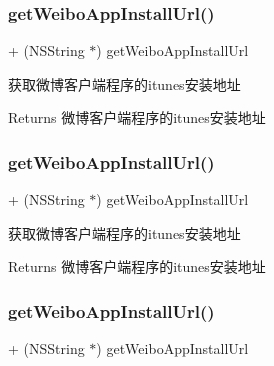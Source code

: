 \subsubsection{\texorpdfstring{get\+Weibo\+App\+Install\+Url()}{getWeiboAppInstallUrl()}\hspace{0.1cm}{\footnotesize\ttfamily [1/3]}}
{\footnotesize\ttfamily + (N\+S\+String $\ast$) get\+Weibo\+App\+Install\+Url \begin{DoxyParamCaption}{ }\end{DoxyParamCaption}}

获取微博客户端程序的itunes安装地址 \begin{DoxyReturn}{Returns}
微博客户端程序的itunes安装地址 
\end{DoxyReturn}
\mbox{\label{interface_weibo_s_d_k_a49504103f9378dcde673b4c6b52b71e3}} 
\subsubsection{\texorpdfstring{get\+Weibo\+App\+Install\+Url()}{getWeiboAppInstallUrl()}\hspace{0.1cm}{\footnotesize\ttfamily [2/3]}}
{\footnotesize\ttfamily + (N\+S\+String $\ast$) get\+Weibo\+App\+Install\+Url \begin{DoxyParamCaption}{ }\end{DoxyParamCaption}}

获取微博客户端程序的itunes安装地址 \begin{DoxyReturn}{Returns}
微博客户端程序的itunes安装地址 
\end{DoxyReturn}
\mbox{\label{interface_weibo_s_d_k_a49504103f9378dcde673b4c6b52b71e3}} 
\subsubsection{\texorpdfstring{get\+Weibo\+App\+Install\+Url()}{getWeiboAppInstallUrl()}\hspace{0.1cm}{\footnotesize\ttfamily [3/3]}}
{\footnotesize\ttfamily + (N\+S\+String $\ast$) get\+Weibo\+App\+Install\+Url \begin{DoxyParamCaption}{ }\end{DoxyParamCaption}}

